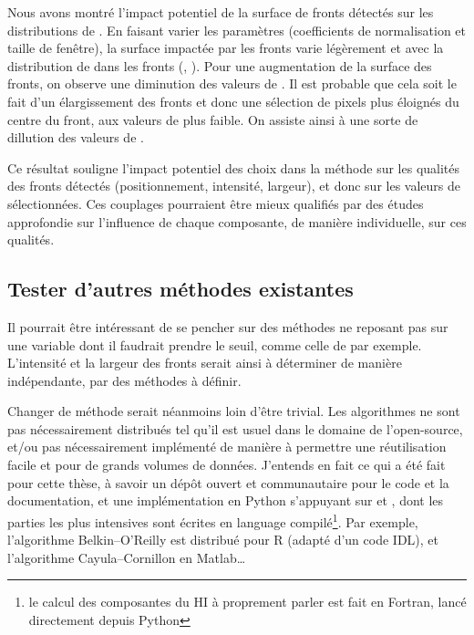 \begin{figure}
  \centering
  \label{fig:asymetrie}
\end{figure}

Nous avons montré l'impact potentiel de la surface de fronts détectés sur les distributions de .
En faisant varier les paramètres (coefficients de normalisation et taille de fenêtre), la surface impactée par les fronts varie légèrement et avec la distribution de  dans les fronts (, ).
Pour une augmentation de la surface des fronts, on observe une diminution des valeurs de .
Il est probable que cela soit le fait d'un élargissement des fronts et donc une sélection de pixels plus éloignés du centre du front, aux valeurs de  plus faible.
On assiste ainsi à une sorte de dillution des valeurs de .

Ce résultat souligne l'impact potentiel des choix dans la méthode sur les qualités des fronts détectés (positionnement, intensité, largeur), et donc sur les valeurs de  sélectionnées.
Ces couplages pourraient être mieux qualifiés par des études approfondie sur l'influence de chaque composante, de manière individuelle, sur ces qualités.

\subsection{Tester d'autres méthodes existantes}

Il pourrait être intéressant de se pencher sur des méthodes ne reposant pas sur une variable dont il faudrait prendre le seuil, comme celle de \textcite{cayula_1995} par exemple.
L'intensité et la largeur des fronts serait ainsi à déterminer de manière indépendante, par des méthodes à définir.

Changer de méthode serait néanmoins loin d'être trivial.
Les algorithmes ne sont pas nécessairement distribués tel qu'il est usuel dans le domaine de l'open-source, et/ou pas nécessairement implémenté de manière à permettre une réutilisation facile et pour de grands volumes de données.
J'entends en fait ce qui a été fait pour cette thèse, à savoir un dépôt ouvert et communautaire pour le code et la documentation, et une implémentation en Python s'appuyant sur  et , dont les parties les plus intensives sont écrites en language compilé\footnote{le calcul des composantes du HI à proprement parler est fait en Fortran, lancé directement depuis Python}.
Par exemple, l'algorithme Belkin--O'Reilly est distribué pour R (adapté d'un code IDL), et l'algorithme Cayula--Cornillon en Matlab\dots

